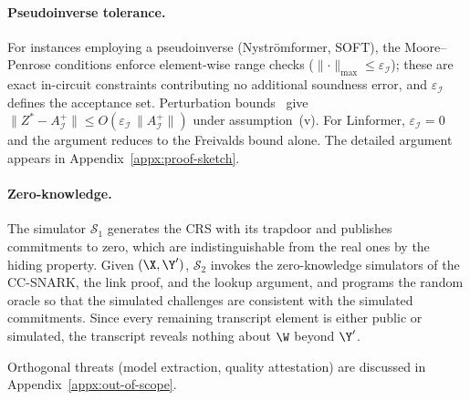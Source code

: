 \paragraph{Pseudoinverse tolerance.}
For instances employing a pseudoinverse (Nystr\"{o}mformer, SOFT), the Moore--Penrose conditions enforce element-wise range checks
($\lVert\cdot\rVert_{\max}\leq\varepsilon_\mathcal{I}$); these are exact in-circuit constraints contributing no additional soundness error, and $\varepsilon_\mathcal{I}$ defines the acceptance set.
Perturbation bounds~\cite{stewart1990matrix} give
$\|Z^{*} - A_\mathcal{I}^{+}\| \le O(\varepsilon_\mathcal{I}\,\|A_\mathcal{I}^{+}\|)$
under assumption~(v). For Linformer, $\varepsilon_\mathcal{I}{=}0$ and the argument reduces to the Freivalds bound alone.
The detailed argument appears in Appendix~\ref{appx:proof-sketch}.

\paragraph{Zero-knowledge.}
The simulator $\mathcal{S}_1$ generates the CRS with its trapdoor and publishes commitments to zero, which are indistinguishable from the real ones by the hiding property. Given $(\X, \Y')$, $\mathcal{S}_2$ invokes the zero-knowledge simulators of the CC-SNARK, the link proof, and the lookup argument, and programs the random oracle so that the simulated challenges are consistent with the simulated commitments. Since every remaining transcript element is either public or simulated, the transcript reveals nothing about $\W$ beyond $\Y'$.

Orthogonal threats (model extraction, quality attestation) are discussed in Appendix~\ref{appx:out-of-scope}.
